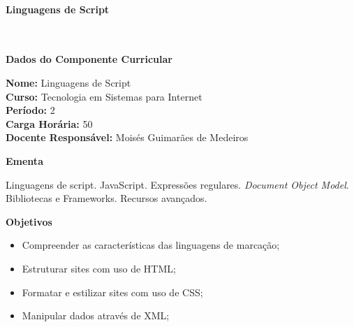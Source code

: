 \paragraph{Linguagens de Script} \


\begin{snugshade}\begin{center}\textbf{
    Dados do Componente Curricular
}\end{center}\end{snugshade}

\noindent \textbf{Nome:}                Linguagens de Script
\\        \textbf{Curso:}               Tecnologia em Sistemas para Internet
\\        \textbf{Período:}             \unit{2}{\degree}
\\        \textbf{Carga Horária:}       \unit{50}{\hour}
\\        \textbf{Docente Responsável:} Moisés Guimarães de Medeiros


\begin{snugshade}\begin{center}\textbf{
    Ementa
\vphantom{q}}\end{center}\end{snugshade}

\noindent
Linguagens de script. JavaScript. Expressões regulares. \textit{Document Object Model}. Bibliotecas e Frameworks. Recursos avançados.


\begin{snugshade}\begin{center}\textbf{
    Objetivos
}\end{center}\end{snugshade}

\begin{itemize}

\item Compreender as características das linguagens de marcação;

\item Estruturar sites com uso de HTML;

\item Formatar e estilizar sites com uso de CSS;

\item Manipular dados através de XML;

\end{itemize}

